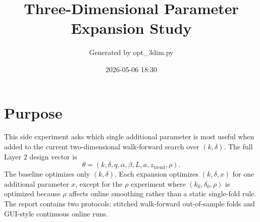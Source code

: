 \documentclass[10pt]{article}
\title{Three-Dimensional Parameter Expansion Study}
\author{Generated by opt\_3dim.py}
\date{2026-05-06 18:30}
\begin{document}
\maketitle

\section*{Purpose}
This side experiment asks which single additional parameter is most useful when
added to the current two-dimensional walk-forward search over $(k,\delta)$.
The full Layer 2 design vector is
\[
\theta=(k,\delta,q,\alpha,\beta,L,a,z_{\mathrm{trend}},\rho).
\]
The baseline optimizes only $(k,\delta)$. Each expansion optimizes $(k,\delta,x)$
for one additional parameter $x$, except for the $\rho$ experiment where
$(k_0,\delta_0,\rho)$ is optimized because $\rho$ affects online smoothing
rather than a static single-fold rule. The report contains two protocols:
stitched walk-forward out-of-sample folds and GUI-style continuous online runs.
\end{document}
